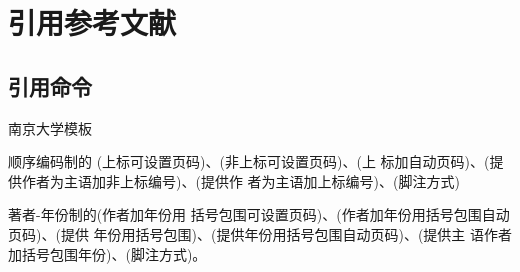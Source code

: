 \chapter{引用参考文献}
\label{chap:bibliography}

\section{引用命令}

南京大学模板\cite{njuthesis}

顺序编码制的 \cite{qiujinhengetal2010}(上标可设置页码)、\parencite{qiujinhengetal2010}(非上标可设置页码)、(上
标加自动页码)、\textcite{qiujinhengetal2010}(提供作者为主语加非上标编号)、(提供作
者为主语加上标编号)、(脚注方式)

著者-年份制的\cite{qiujinhengetal2010,njuthesis}(作者加年份用
括号包围可设置页码)、(作者加年份用括号包围自动页码)、(提供
年份用括号包围)、(提供年份用括号包围自动页码)、\textcite{qiujinhengetal2010}(提供主
语作者加括号包围年份)、(脚注方式)。
